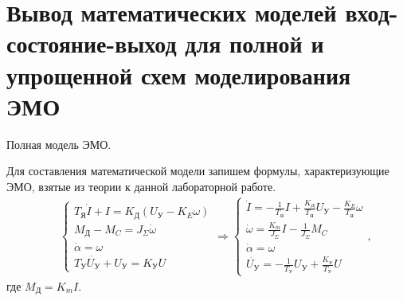 \documentclass[12pt,a4paper]{article}
\begin{document}
\section{Вывод математических моделей вход-состояние-выход для полной и упрощенной схем моделирования ЭМО}
Полная модель ЭМО.\par
Для составления математической модели запишем формулы, характеризующие ЭМО, взятые из теории к данной лабораторной работе.
\begin{align}
	&&\begin{cases}
		T_\text{Я}\dot{I} + I = K_\text{Д}(U_\text{У} - K_E\omega)\\
		M_\text{Д} - M_C = J_\Sigma\dot{\omega}\\
		\dot{\alpha} = \omega\\
		T_\text{У}\dot{U_\text{У}} + U_\text{У} = K_\text{У}U
	\end{cases}
	\Rightarrow
	\begin{cases}
		\dot{I} = \displaystyle{- \frac{1}{T_\text{Я}}I + \frac{K_\text{Д}}{T_\text{Я}}U_\text{У} -\frac{K_E}{T_\text{Я}}}\omega \\
		\dot{\omega} = \displaystyle{\frac{K_m}{J_\Sigma}}I - \frac{1}{J_\Sigma}M_C\\
		\dot{\alpha} = \omega\\
		\dot{U_\text{У}} = -\displaystyle{\frac{1}{T_\text{У}}U_\text{У}} + \frac{K_\text{У}}{T_\text{У}}U
	\end{cases}
	,
	\label{ESETh}
\end{align}
где $M_\text{Д} = K_mI$.
	
\end{document}
